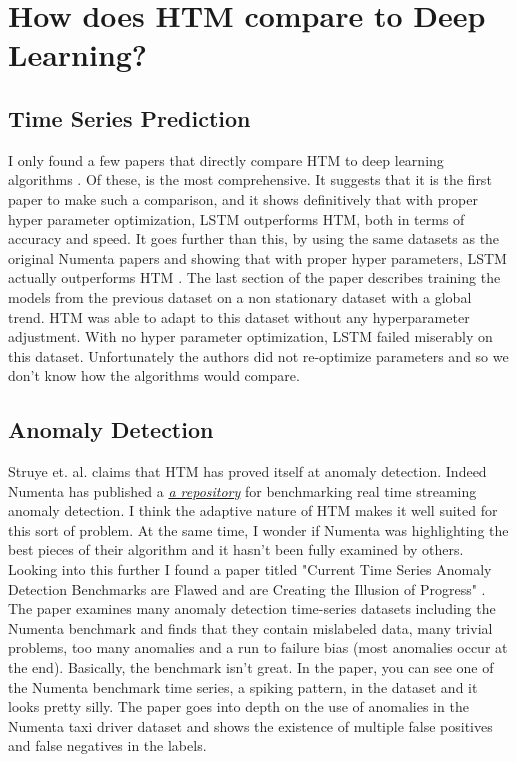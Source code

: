 \documentclass{article}
\begin{document}
\section*{How does HTM compare to Deep Learning?}

\subsection*{Time Series Prediction}
I only found a few papers that directly compare HTM to deep learning algorithms \cite{Struye2020, Mackenzie2019, Cui2016, Cui2016b}. Of these, \cite{Struye2020} is the most comprehensive. It suggests that it is the first paper to make such a comparison, and it shows definitively that with proper hyper parameter optimization, LSTM outperforms HTM, both in terms of accuracy and speed. It goes further than this, by using the same datasets as the original Numenta papers and showing that with proper hyper parameters, LSTM actually outperforms HTM \cite{Cui2016, Cui2016b}. The last section of the paper describes training the models from the previous dataset on a non stationary dataset with a global trend. HTM was able to adapt to this dataset without any hyperparameter adjustment. With no hyper parameter optimization, LSTM failed miserably on this dataset. Unfortunately the authors did not re-optimize parameters and so we don't know how the algorithms would compare.

\subsection*{Anomaly Detection}

Struye et. al. claims that HTM has proved itself at anomaly detection. Indeed Numenta has published a \textit{\href{https://github.com/numenta/NAB}{a repository}} for benchmarking real time streaming anomaly detection. I think the adaptive nature of HTM makes it well suited for this sort of problem. At the same time, I wonder if Numenta was highlighting the best pieces of their algorithm and it hasn't been  fully examined by others. Looking into this further I found a paper titled "Current Time Series Anomaly Detection Benchmarks are Flawed and are Creating the Illusion of Progress" \cite{Wu2021}. The paper examines many anomaly detection time-series datasets including the Numenta benchmark and finds that they contain mislabeled data, many trivial problems, too many anomalies and a run to failure bias (most anomalies occur at the end). Basically, the benchmark isn't great. In the paper, you can see one of the Numenta benchmark time series, a spiking pattern, in the dataset and it looks pretty silly. The paper goes into depth on the use of anomalies in the Numenta taxi driver dataset and shows the existence of multiple false positives and false negatives in the labels. 
\end{document}
